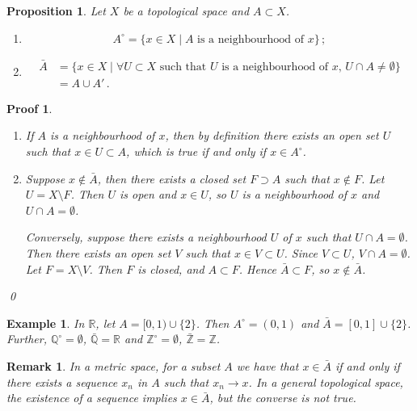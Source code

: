 \documentclass{article}
\theoremstyle{plain}\theoremheaderfont{\normalfont\itshape}\theorembodyfont{\rmfamily}\theoremseparator{.}\newtheorem*{rem}{Remark}\newtheorem*{ex}{Example}\newtheorem*{proof}{Proof}\newtheorem*{altp}{Alternative proof}
\theoremstyle{plain}\theoremheaderfont{\normalfont\bfseries}\theorembodyfont{\rmfamily}\theoremseparator{.}\newtheorem{thm}{Theorem}[section]\newtheorem{lem}[thm]{Lemma}\newtheorem{prop}[thm]{Proposition}\newtheorem*{cor}{Corollary}\newtheorem{defn}[thm]{Definition}\newtheorem{clm}[thm]{Claim}\newtheorem{clminproof}{Claim}
\theoremstyle{break}\theoremheaderfont{\normalfont\itshape}\theorembodyfont{\rmfamily}\theoremseparator{.\medskip}\newtheorem*{proofskip}{Proof}\newtheorem*{exs}{Examples}\newtheorem*{rems}{Remarks}
\theoremstyle{break}\theoremheaderfont{\normalfont\bfseries}\theorembodyfont{\rmfamily}\theoremseparator{.\medskip}\newtheorem{lemskip}[thm]{Lemma}\newtheorem{defnskip}[thm]{Definition}\newtheorem{propskip}[thm]{Proposition}\newtheorem{thmskip}[thm]{Theorem}
\newcommand{\qed}{\hfill\ensuremath{\Box}}
\begin{document}
    \begin{prop}
        Let \(X\) be a topological space and \(A\subset X\).
        \begin{enumerate}[label=(\roman*),topsep=0pt]
            \item \[A^\circ=\{x\in X\mid A\text{ is a neighbourhood of }x\}\,;\]
            \item \begin{align*}
                \bar{A}&=\{x\in X\mid\forall U\subset X\text{ such that }U\text{ is a neighbourhood of }x,\,U\cap A\ne\emptyset\}\\
                &=A\cup A'\,.
            \end{align*}
        \end{enumerate}
    \end{prop}
    \begin{proofskip}
        \begin{enumerate}[label=(\roman*),topsep=0pt]
            \item If \(A\) is a neighbourhood of \(x\), then by definition there exists an open set \(U\) such that \(x\in U\subset A\), which is true if and only if \(x\in A^\circ\).
            \item Suppose \(x\not\in\bar{A}\), then there exists a closed set \(F\supset A\) such that \(x\not\in F\). Let \(U=X\setminus F\). Then \(U\) is open and \(x\in U\), so \(U\) is a neighbourhood of \(x\) and \(U\cap A=\emptyset\).
            
            Conversely, suppose there exists a neighbourhood \(U\) of \(x\) such that \(U\cap A=\emptyset\). Then there exists an open set \(V\) such that \(x\in V\subset U\). Since \(V\subset U\), \(V\cap A=\emptyset\). Let \(F=X\setminus V\). Then \(F\) is closed, and \(A\subset F\). Hence \(\bar{A}\subset F\), so \(x\notin\bar{A}\).
        \end{enumerate}\qed
    \end{proofskip}
    \begin{ex}
        In \(\mathbb{R}\), let \(A=[0,1)\cup\{2\}\). Then \(A^\circ=(0,1)\) and \(\bar{A}=[0,1]\cup\{2\}\). Further, \(\mathbb{Q}^\circ=\emptyset\), \(\bar{\mathbb{Q}}=\mathbb{R}\) and \(\mathbb{Z}^\circ=\emptyset\), \(\bar{\mathbb{Z}}=\mathbb{Z}\).
    \end{ex}
    \begin{rem}
        In a metric space, for a subset \(A\) we have that \(x\in\bar{A}\) if and only if there exists a sequence \(x_n\) in \(A\) such that \(x_n\to x\). In a general topological space, the existence of a sequence implies \(x\in\bar{A}\), but the converse is not true.
    \end{rem}
\end{document}
